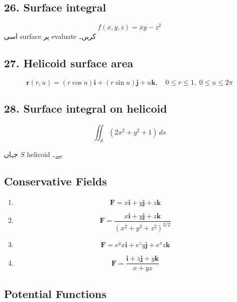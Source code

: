 \begin{enumerate}
\bigskip

\subsection*{26. Surface integral}

\[
f(x,y,z) = xy - z^2
\]
اسی surface پر evaluate کریں۔

\bigskip

\subsection*{27. Helicoid surface area}

\[
\mathbf{r}(r,u) =
(r\cos u)\mathbf{i} + (r\sin u)\mathbf{j} + u\mathbf{k},
\quad 0 \le r \le 1,\; 0 \le u \le 2\pi
\]

\bigskip

\subsection*{28. Surface integral on helicoid}

\[
\iint_S (2x^2 + y^2 + 1)\, ds
\]

جہاں \( S \) helicoid ہے۔

\bigskip

\subsection*{Conservative Fields}

\begin{enumerate}
\item[29.]
\[
\mathbf{F} = x\mathbf{i} + y\mathbf{j} + z\mathbf{k}
\]

\item[30.]
\[
\mathbf{F} = \frac{x\mathbf{i}+y\mathbf{j}+z\mathbf{k}}{(x^2+y^2+z^2)^{3/2}}
\]

\item[31.]
\[
\mathbf{F} = e^y x\mathbf{i} + e^z y\mathbf{j} + e^x z\mathbf{k}
\]

\item[32.]
\[
\mathbf{F} = \frac{\mathbf{i} + z\mathbf{j} + y\mathbf{k}}{x + yz}
\]
\end{enumerate}

\bigskip

\subsection*{Potential Functions}


\end{enumerate}
